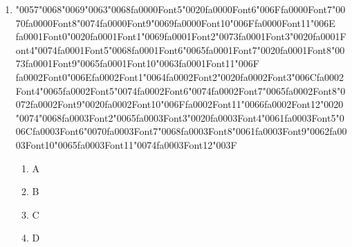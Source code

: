 \documentclass[12pt]{article}
\begin{document}
 \begin{enumerate}[label=Q\arabic*.]
 
 \item {\char"0057}{\char"0068}{\char"0069}{\char"0063}{\char"0068}{\csname fa0000Font5\endcsname\char"0020}{\csname fa0000Font6\endcsname\char"006F}{\csname fa0000Font7\endcsname\char"0070}{\csname fa0000Font8\endcsname\char"0074}{\csname fa0000Font9\endcsname\char"0069}{\csname fa0000Font10\endcsname\char"006F}{\csname fa0000Font11\endcsname\char"006E} {\csname fa0001Font0\endcsname\char"0020}{\csname fa0001Font1\endcsname\char"0069}{\csname fa0001Font2\endcsname\char"0073}{\csname fa0001Font3\endcsname\char"0020}{\csname fa0001Font4\endcsname\char"0074}{\csname fa0001Font5\endcsname\char"0068}{\csname fa0001Font6\endcsname\char"0065}{\csname fa0001Font7\endcsname\char"0020}{\csname fa0001Font8\endcsname\char"0073}{\csname fa0001Font9\endcsname\char"0065}{\csname fa0001Font10\endcsname\char"0063}{\csname fa0001Font11\endcsname\char"006F} {\csname fa0002Font0\endcsname\char"006E}{\csname fa0002Font1\endcsname\char"0064}{\csname fa0002Font2\endcsname\char"0020}{\csname fa0002Font3\endcsname\char"006C}{\csname fa0002Font4\endcsname\char"0065}{\csname fa0002Font5\endcsname\char"0074}{\csname fa0002Font6\endcsname\char"0074}{\csname fa0002Font7\endcsname\char"0065}{\csname fa0002Font8\endcsname\char"0072}{\csname fa0002Font9\endcsname\char"0020}{\csname fa0002Font10\endcsname\char"006F}{\csname fa0002Font11\endcsname\char"0066}{\csname fa0002Font12\endcsname\char"0020} {\char"0074}{\char"0068}{\csname fa0003Font2\endcsname\char"0065}{\csname fa0003Font3\endcsname\char"0020}{\csname fa0003Font4\endcsname\char"0061}{\csname fa0003Font5\endcsname\char"006C}{\csname fa0003Font6\endcsname\char"0070}{\csname fa0003Font7\endcsname\char"0068}{\csname fa0003Font8\endcsname\char"0061}{\csname fa0003Font9\endcsname\char"0062}{\csname fa0003Font10\endcsname\char"0065}{\csname fa0003Font11\endcsname\char"0074}{\csname fa0003Font12\endcsname\char"003F}
 \begin{enumerate}[label=(\Alph*)]
     \item A
     \item B
     \item C
     \item D
 \end{enumerate}
 

\end{enumerate}
\end{document}
